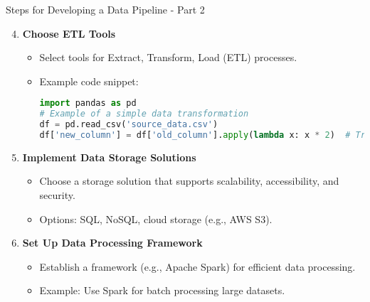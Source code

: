 \documentclass[aspectratio=169]{beamer}
\begin{document}
\begin{frame}[fragile]{Steps for Developing a Data Pipeline - Part 2}
    \begin{enumerate}
        \setcounter{enumi}{3}
        \item \textbf{Choose ETL Tools}
        \begin{itemize}
            \item Select tools for Extract, Transform, Load (ETL) processes. 
            \item Example code snippet:
            \begin{lstlisting}[language=Python]
import pandas as pd
# Example of a simple data transformation
df = pd.read_csv('source_data.csv')
df['new_column'] = df['old_column'].apply(lambda x: x * 2)  # Transforming data
            \end{lstlisting}
        \end{itemize}
        
        \item \textbf{Implement Data Storage Solutions}
        \begin{itemize}
            \item Choose a storage solution that supports scalability, accessibility, and security.
            \item Options: SQL, NoSQL, cloud storage (e.g., AWS S3).
        \end{itemize}
        
        \item \textbf{Set Up Data Processing Framework}
        \begin{itemize}
            \item Establish a framework (e.g., Apache Spark) for efficient data processing.
            \item Example: Use Spark for batch processing large datasets.
        \end{itemize}
    \end{enumerate}
\end{frame}
\end{document}
